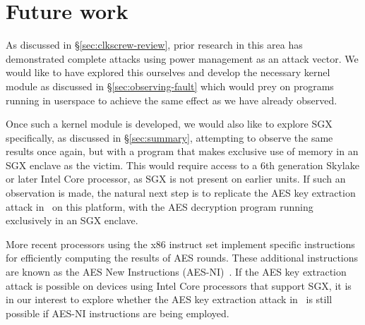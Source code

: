 \section{Future work}
\label{sec:future}

As discussed in §\ref{sec:clkscrew-review}, prior research in this area has
demonstrated complete attacks using power management as an attack vector. We
would like to have explored this ourselves and develop the necessary kernel
module as discussed in §\ref{sec:observing-fault} which would prey on programs
running in userspace to achieve the same effect as we have already observed.

Once such a kernel module is developed, we would also like to explore SGX
specifically, as discussed in §\ref{sec:summary}, attempting to observe the
same results once again, but with a program that makes exclusive use of memory
in an SGX enclave as the victim. This would require access to a 6th generation
Skylake or later Intel Core processor, as SGX is not present on earlier units.
If such an observation is made, the natural next step is to replicate the AES
key extraction attack in~\cite{clkscrew} on this platform, with the AES
decryption program running exclusively in an SGX enclave.

More recent processors using the x86 instruct set implement specific
instructions for efficiently computing the results of AES rounds. These
additional instructions are known as the AES New Instructions (AES-NI)~\cite{aesni}.
If the AES key extraction attack is possible on devices using Intel Core
processors that support SGX, it is in our interest to explore whether the AES
key extraction attack in~\cite{clkscrew} is still possible if AES-NI
instructions are being employed.
